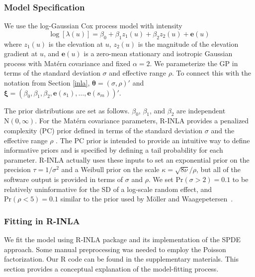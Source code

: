 \documentclass[]{interact}
\begin{document}
\subsubsection{Model Specification}
\label{beimodel}

We use the log-Gaussian Cox process model with intensity
\begin{equation}
\log\left[\lambda(u)\right] = \beta_{0} + \beta_{1} z_{1}(u)
+ \beta_{2} z_{2}(u) + \mathbf{e}(u)
\end{equation}
where \(z_{1}(u)\) is the elevation at \(u\), \(z_{2}(u)\) is the magnitude of
the elevation gradient at \(u\), and \(\mathbf{e}(u)\) is a zero-mean
stationary and isotropic Gaussian process with Mat\'{e}rn covariance and fixed
\(\alpha = 2\). We parameterize the GP in terms of the standard deviation
\(\sigma\) and effective range \(\rho\). To connect this with the notation
from Section \ref{inla}, \(\boldsymbol{\theta} = (\sigma, \rho)'\) and
\(\boldsymbol{\xi} = (\beta_{0}, \beta_{1}, \beta_{2}, \mathbf{e}(s_{1}),
\dots, \mathbf{e}(s_{m}))'\).

The prior distributions are set as follows. \(\beta_{0}\), \(\beta_{1}\), and
\(\beta_{2}\) are independent \(\mathrm{N}(0, \infty)\). For the Mat\'{e}rn
covariance parameters, R-INLA provides a penalized complexity (PC) prior
defined in terms of the standard deviation \(\sigma\) and the effective range
\(\rho\) \cite{fuglstadetal,simpsonpc}. The PC prior is intended to provide an
intuitive way to define informative priors and is specified by defining a tail
probability for each parameter. R-INLA actually uses these inputs to set an
exponential prior on the precision \(\tau = 1 / \sigma^{2}\) and a Weibull
prior on the scale \(\kappa = \sqrt{8 \nu} / \rho\), but all of the software output
is provided in terms of \(\sigma\) and \(\rho\). We set
\(\mathrm{Pr}(\sigma > 2) = 0.1\) to be relatively uninformative for the SD of
a log-scale random effect, and \(\mathrm{Pr}(\rho < 5) = 0.1\) similar to the
prior used by M\"{o}ller and Waagepetersen~\cite{moellerwaagepetersen}.


\subsubsection{Fitting in R-INLA}
\label{beifitting}

We fit the model using R-INLA package and its implementation of
the SPDE approach. Some manual preprocessing was needed to employ the Poisson
factorization. Our R code can be found in the supplementary materials. This
section provides a conceptual explanation of the model-fitting process.
\end{document}
